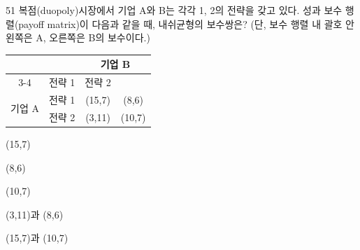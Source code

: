 \begin{question}{51}
복점(duopoly)시장에서 기업 A와 B는 각각 1, 2의 전략을 갖고 있다. 성과 보수 행렬(payoff matrix)이 다음과 같을 때, 내쉬균형의 보수쌍은? (단, 보수 행렬 내 괄호 안 왼쪽은 A, 오른쪽은 B의 보수이다.)
\par
{\small\centering
\begin{tabular}{|c|c|c|c|}\hline
\multicolumn{2}{|c|}{} & \multicolumn{2}{c|}{기업 B}\\\cline{3-4}
\multicolumn{2}{|c|}{} & 전략 1 & 전략 2\\\hline
\multirow{2}{*}{기업 A} & 전략 1 & (15,7) & (8,6)\\\cline{2-4}
 & 전략 2 & (3,11) & (10,7)\\\hline
\end{tabular}\par}
\begin{choices}
  \item (15,7)
  \item (8,6)
  \item (10,7)
  \item (3,11)과 (8,6)
  \item (15,7)과 (10,7)
\end{choices}
\end{question}
